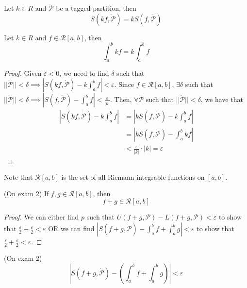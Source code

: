 \begin{lemma}{}{}
    Let $k \in R$ and $\dot{\mathcal{P}}$ be a tagged partition, then $$S(kf, \dot{\mathcal{P}}) = kS(f, \dot{\mathcal{P}})$$
\end{lemma}
\begin{theorem}{}{}
    Let $k \in R$ and $f \in \mathcal{R}[a, b]$, then $$\int_a^b kf = k \int_a^b f$$
\end{theorem}
\begin{proof}
    Given $\varepsilon < 0$, we need to find $\delta$ such that $||\dot{\mathcal{P}}|| < \delta \implies |S(kf, \dot{\mathcal{P}}) - k \int_a^b f| < \varepsilon$. Since $f \in \mathcal{R}[a, b]$, $\exists \delta$ such that $||\dot{\mathcal{P}}|| < \delta \implies |S(f, \dot{\mathcal{P}}) - \int_a^b f| < \frac{\varepsilon}{|k|}$. Then, $\forall \dot{\mathcal{P}}$ such that $||\dot{\mathcal{P}}|| < \delta$, we have that
    \begin{align*}
        \left|S(kf, \dot{\mathcal{P}}) - k \int_a^b f\right| &= \left|kS(f, \dot{\mathcal{P}}) - k \int_a^b f\right| \\
        &= \left|kS(f, \dot{\mathcal{P}}) - \int_a^b kf\right| \\
        &< \frac{\varepsilon}{|k|} \cdot |k| = \varepsilon
    \end{align*}
\end{proof}
\begin{note}
    Note that $\mathcal{R}[a, b]$ is the set of all Riemann integrable functions on $[a, b]$.
\end{note}

\begin{theorem}{}{}
    (On exam 2) If $f, g \in \mathcal{R}[a, b]$, then $$f + g \in \mathcal{R}[a, b]$$
\end{theorem}
\begin{proof}
    We can either find $p$ such that $U(f + g, \mathcal{P}) - L(f + g, \mathcal{P}) < \varepsilon$ to show that $\frac{\varepsilon}{2} + \frac{\varepsilon}{2} < \varepsilon$ OR we can find $|S(f + g, \dot{\mathcal{P}}) - \int_a^b f + \int_a^b g| < \varepsilon$ to show that $\frac{\varepsilon}{2} + \frac{\varepsilon}{2} < \varepsilon$.
\end{proof}

\begin{theorem}{}{}
    (On exam 2) $$\left|S(f + g, \dot{\mathcal{P}}) - \left(\int_a^b f + \int_a^b g\right)\right| < \varepsilon$$
\end{theorem}